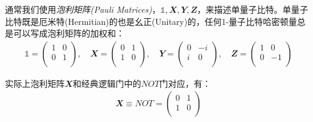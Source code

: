 通常我们使用\emph{泡利矩阵(Pauli Matrices)}，$\mathbb{1}, \mathbfit{X}, \mathbfit{Y}, \mathbfit{Z}$，来描述单量子比特。单量子比特既是厄米特(Hermitian)的也是幺正(Unitary)的，任何1-量子比特哈密顿量总是可以写成泡利矩阵的加权和：
\begin{align}
    \mathbb{1}=\begin{pmatrix}
        1 & 0 \\
        0 & 1 \\
    \end{pmatrix}, \quad \mathbfit{X}=\begin{pmatrix}
        0 & 1 \\
        1 & 0 \\
    \end{pmatrix}, \quad  \mathbfit{Y}=\begin{pmatrix}
        0 & -i \\
        i & 0 \\
    \end{pmatrix}, \quad  \mathbfit{Z}=\begin{pmatrix}
        1 & 0 \\
        0 & -1 \\
    \end{pmatrix}
\end{align}

实际上泡利矩阵$\mathbfit{X}$和经典逻辑门中的$NOT$门对应，有：
\begin{align}
    \mathbfit{X}\equiv NOT = \begin{pmatrix}
        0 & 1 \\
        1 & 0 \\
    \end{pmatrix}
\end{align}

